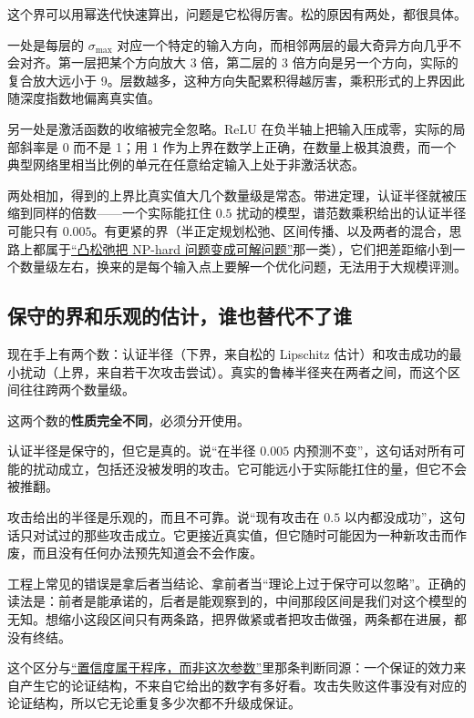 这个界可以用幂迭代快速算出，问题是它松得厉害。松的原因有两处，都很具体。

一处是每层的 \(\sigma_{\max}\) 对应一个特定的输入方向，而相邻两层的最大奇异方向几乎不会对齐。第一层把某个方向放大 3 倍，第二层的 3 倍方向是另一个方向，实际的复合放大远小于 9。层数越多，这种方向失配累积得越厉害，乘积形式的上界因此随深度指数地偏离真实值。

另一处是激活函数的收缩被完全忽略。ReLU 在负半轴上把输入压成零，实际的局部斜率是 0 而不是 1；用 1 作为上界在数学上正确，在数量上极其浪费，而一个典型网络里相当比例的单元在任意给定输入上处于非激活状态。

两处相加，得到的上界比真实值大几个数量级是常态。带进定理，认证半径就被压缩到同样的倍数——一个实际能扛住 \(0.5\) 扰动的模型，谱范数乘积给出的认证半径可能只有 \(0.005\)。有更紧的界（半正定规划松弛、区间传播、以及两者的混合，思路上都属于\hyperref[sec:09-Convex-Optimization/09-Complexity-and-Approximation/02]{``凸松弛把 NP-hard 问题变成可解问题''}那一类），它们把差距缩小到一个数量级左右，换来的是每个输入点上要解一个优化问题，无法用于大规模评测。

\subsection{保守的界和乐观的估计，谁也替代不了谁}

现在手上有两个数：认证半径（下界，来自松的 Lipschitz 估计）和攻击成功的最小扰动（上界，来自若干次攻击尝试）。真实的鲁棒半径夹在两者之间，而这个区间往往跨两个数量级。

这两个数的\textbf{性质完全不同}，必须分开使用。

认证半径是保守的，但它是真的。说``在半径 \(0.005\) 内预测不变''，这句话对所有可能的扰动成立，包括还没被发明的攻击。它可能远小于实际能扛住的量，但它不会被推翻。

攻击给出的半径是乐观的，而且不可靠。说``现有攻击在 \(0.5\) 以内都没成功''，这句话只对试过的那些攻击成立。它更接近真实值，但它随时可能因为一种新攻击而作废，而且没有任何办法预先知道会不会作废。

工程上常见的错误是拿后者当结论、拿前者当``理论上过于保守可以忽略''。正确的读法是：前者是能承诺的，后者是能观察到的，中间那段区间是我们对这个模型的无知。想缩小这段区间只有两条路，把界做紧或者把攻击做强，两条都在进展，都没有终结。

这个区分与\hyperref[sec:11-Mathematical-Statistics/04-Interval-Estimation/01]{``置信度属于程序，而非这次参数''}里那条判断同源：一个保证的效力来自产生它的论证结构，不来自它给出的数字有多好看。攻击失败这件事没有对应的论证结构，所以它无论重复多少次都不升级成保证。

